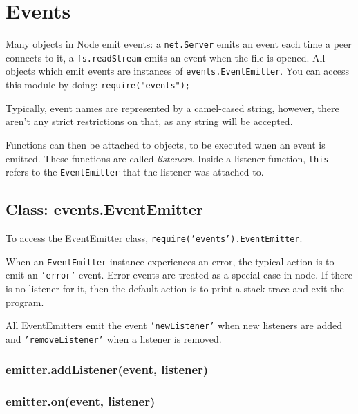 \section{Events}\label{events}

\begin{Shaded}
\begin{Highlighting}[]
 
\end{Highlighting}
\end{Shaded}

Many objects in Node emit events: a \texttt{net.Server} emits an event
each time a peer connects to it, a \texttt{fs.readStream} emits an event
when the file is opened. All objects which emit events are instances of
\texttt{events.EventEmitter}. You can access this module by doing:
\texttt{require("events");}

Typically, event names are represented by a camel-cased string, however,
there aren't any strict restrictions on that, as any string will be
accepted.

Functions can then be attached to objects, to be executed when an event
is emitted. These functions are called \emph{listeners}. Inside a
listener function, \texttt{this} refers to the \texttt{EventEmitter}
that the listener was attached to.

\subsection{Class: events.EventEmitter}\label{class-events.eventemitter}

To access the EventEmitter class,
\texttt{require('events').EventEmitter}.

When an \texttt{EventEmitter} instance experiences an error, the typical
action is to emit an \texttt{'error'} event. Error events are treated as
a special case in node. If there is no listener for it, then the default
action is to print a stack trace and exit the program.

All EventEmitters emit the event \texttt{'newListener'} when new
listeners are added and \texttt{'removeListener'} when a listener is
removed.

\subsubsection{emitter.addListener(event,
listener)}\label{emitter.addlistenerevent-listener}

\subsubsection{emitter.on(event,
listener)}\label{emitter.onevent-listener}

